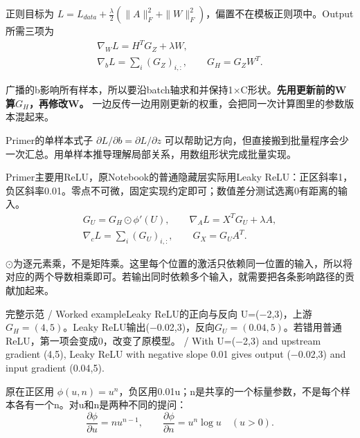 正则目标为 \(L=L_{data}+\frac\lambda2(\|A\|_F^2+\|W\|_F^2)\)，偏置不在模板正则项中。Output所需三项为
\[
\begin{gathered}\nabla_W L=H^TG_Z+\lambda W,\\
\nabla_b L=\sum_i(G_Z)_{i,:},\qquad G_H=G_ZW^T.\end{gathered}\tag{A2.2}
\]


广播的b影响所有样本，所以要沿batch轴求和并保持1\ensuremath{\times}C形状。\textbf{先用更新前的W算\(G_H\)，再修改W。} 一边反传一边用刚更新的权重，会把同一次计算图里的参数版本混起来。


Primer的单样本式子 \(\partial L/\partial b=\partial L/\partial z\) 可以帮助记方向，但直接搬到批量程序会少一次汇总。用单样本推导理解局部关系，用数组形状完成批量实现。





Primer主要用ReLU，原Notebook的普通隐藏层实际用Leaky ReLU：正区斜率1，负区斜率0.01。零点不可微，固定实现约定即可；数值差分测试选离0有距离的输入。
\[
\begin{gathered}G_U=G_H\odot\phi'(U),\qquad \nabla_A L=X^TG_U+\lambda A,\\
\nabla_c L=\sum_i(G_U)_{i,:},\qquad G_X=G_UA^T.\end{gathered}\tag{A2.3}
\]


\(\odot\)为逐元素乘，不是矩阵乘。这里每个位置的激活只依赖同一位置的输入，所以将对应的两个导数相乘即可。若输出同时依赖多个输入，就需要把各条影响路径的贡献加起来。


\begin{StudyBlock}{完整示范 / Worked example}{Leaky ReLU的正向与反向}
U=(\ensuremath{-}2,3)，上游\(G_H=(4,5)\)。Leaky ReLU输出(\ensuremath{-}0.02,3)，反向\(G_U=(0.04,5)\)。若错用普通ReLU，第一项会变成0，改变了原模型。 / With U=(\ensuremath{-}2,3) and upstream gradient (4,5), Leaky ReLU with negative slope 0.01 gives output (\ensuremath{-}0.02,3) and input gradient (0.04,5).
\end{StudyBlock}








原在正区用 \(\phi(u,n)=u^n\)，负区用0.01u；n是共享的一个标量参数，不是每个样本各有一个n。对u和n是两种不同的提问：
\[
\frac{\partial\phi}{\partial u}=nu^{n-1},\qquad
\frac{\partial\phi}{\partial n}=u^n\log u\quad(u>0).\tag{A2.4}
\]


